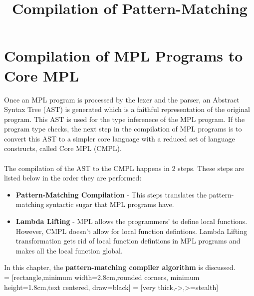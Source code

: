\documentclass[11pt]{article}
\title{Compilation of Pattern-Matching}
\begin{document}
\maketitle
\section {Compilation of MPL Programs to Core MPL}

Once an MPL program is processed by the lexer and the parser, an Abstract Syntax Tree (AST) is generated which is a faithful representation of the original program. This AST is used for the type inferenece of the MPL program. If the program type checks, the next step in the compilation of MPL programs is to convert this AST to a simpler core language with a reduced set of language constructs, called Core MPL (CMPL).
~~\\~~\\ 
The compilation of the AST to the CMPL happens in 2 steps. These steps are listed below in the order they are performed:
\begin {itemize}
  \item {\bf Pattern-Matching Compilation} - This steps translates the pattern-matching syntactic sugar that MPL programs have.  
  \item {\bf Lambda Lifting} - MPL allows the programmers' to define local functions. However, CMPL doesn't allow for local function defintions. Lambda Lifting transformation gets rid of local function defintions in MPL programs and makes all the local function global.
\end{itemize}
In this chapter, the {\bf pattern-matching compiler algorithm} is discussed. 
~~\\
 = [rectangle,minimum width=2.8cm,rounded corners,
                     minimum height=1.8cm,text centered, draw=black]
 = [very thick,->,>=stealth]
\end{document}
